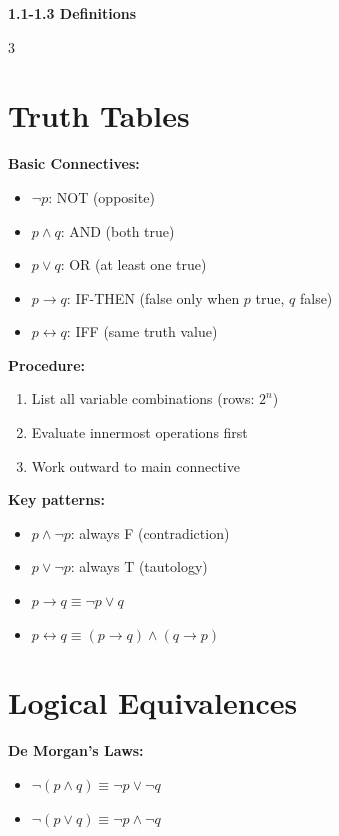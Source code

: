 \documentclass[8pt]{article}
\begin{document}
\begin{center}
\textbf{\large 1.1-1.3 Definitions}
\end{center}
\vspace{-6pt}

\begin{multicols}{3}
\small

\section*{Truth Tables}
\textbf{Basic Connectives:}
\vspace{-2pt}
\begin{itemize}[nosep]
\item $\neg p$: NOT (opposite)
\item $p \land q$: AND (both true)
\item $p \lor q$: OR (at least one true)
\item $p \to q$: IF-THEN (false only when $p$ true, $q$ false)
\item $p \leftrightarrow q$: IFF (same truth value)
\end{itemize}

\textbf{Procedure:}
\begin{enumerate}[nosep]
\item List all variable combinations (rows: $2^n$)
\item Evaluate innermost operations first
\item Work outward to main connective
\end{enumerate}

\textbf{Key patterns:}
\begin{itemize}[nosep]
\item $p \land \neg p$: always F (contradiction)
\item $p \lor \neg p$: always T (tautology)
\item $p \to q \equiv \neg p \lor q$
\item $p \leftrightarrow q \equiv (p \to q) \land (q \to p)$
\end{itemize}

\section*{Logical Equivalences}
\textbf{De Morgan's Laws:}
\begin{itemize}[nosep]
\item $\neg(p \land q) \equiv \neg p \lor \neg q$
\item $\neg(p \lor q) \equiv \neg p \land \neg q$
\end{itemize}


\end{multicols}
\end{document}
